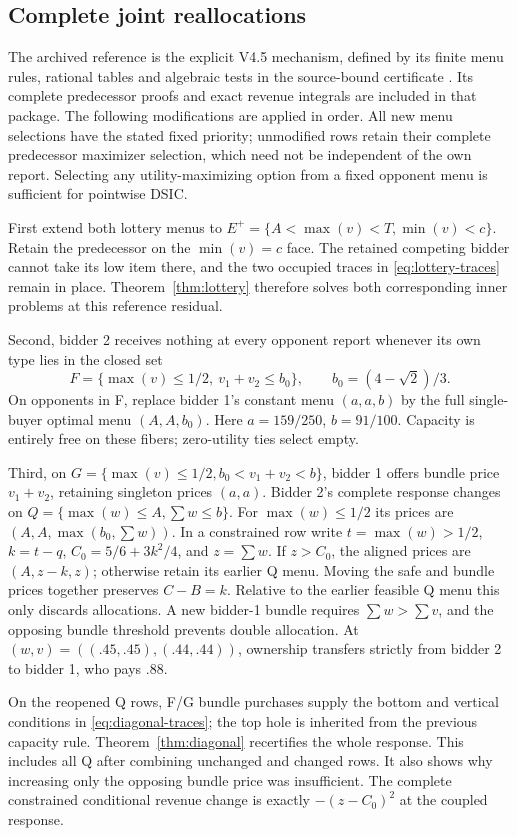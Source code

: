 \subsection{Complete joint reallocations}\label{sec:joint-mechanism}

The archived reference is the explicit V4.5 mechanism, defined by its finite
menu rules, rational tables and algebraic tests in the source-bound
certificate . Its complete
predecessor proofs and exact revenue integrals are included in that package.
The following modifications are applied in order. All new menu selections
have the stated fixed priority; unmodified rows retain their complete
predecessor maximizer selection, which need not be independent of the own
report. Selecting any utility-maximizing option from a fixed opponent menu
is sufficient for pointwise DSIC.

First extend both lottery menus to
$E^+=\{A<\max(v)<T,\min(v)<c\}$. Retain the predecessor on the
$\min(v)=c$ face. The retained competing bidder cannot take its low item
there, and the two occupied traces in \eqref{eq:lottery-traces} remain in
place. Theorem~\ref{thm:lottery} therefore solves both corresponding inner
problems at this reference residual.

Second, bidder 2 receives nothing at every opponent report whenever its
own type lies in the closed set
\[
F=\{\max(v)\le1/2,\ v_1+v_2\le b_0\},\qquad
b_0=(4-\sqrt2)/3.
\]
On opponents in F, replace bidder 1's constant menu $(a,a,b)$ by the full
single-buyer optimal menu $(A,A,b_0)$. Here $a=159/250$, $b=91/100$.
Capacity is entirely free on these fibers; zero-utility ties select empty.

Third, on $G=\{\max(v)\le1/2,b_0<v_1+v_2<b\}$, bidder 1 offers bundle
price $v_1+v_2$, retaining singleton prices $(a,a)$. Bidder 2's complete
response changes on $Q=\{\max(w)\le A,\sum w\le b\}$. For $\max(w)\le1/2$
its prices are $(A,A,\max(b_0,\sum w))$. In a constrained row write
$t=\max(w)>1/2$, $k=t-q$, $C_0=5/6+3k^2/4$, and $z=\sum w$.
If $z>C_0$, the aligned prices are $(A,z-k,z)$; otherwise retain its earlier
Q menu. Moving the safe and bundle prices together preserves $C-B=k$.
Relative to the earlier feasible Q menu this only discards allocations.
A new bidder-1 bundle requires $\sum w>\sum v$, and the opposing bundle
threshold prevents double allocation. At $(w,v)=((.45,.45),(.44,.44))$,
ownership transfers strictly from bidder 2 to bidder 1, who pays $.88$.

On the reopened Q rows, F/G bundle purchases supply the bottom and vertical
conditions in \eqref{eq:diagonal-traces}; the top hole is inherited from the
previous capacity rule. Theorem~\ref{thm:diagonal} recertifies the whole
response. This includes all Q after combining unchanged and changed rows.
It also shows why increasing only the opposing bundle price was insufficient.
The complete constrained conditional revenue change is exactly
$-(z-C_0)^2$ at the coupled response.

